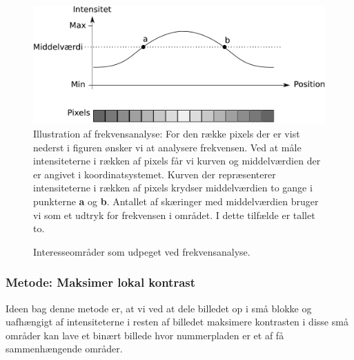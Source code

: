 \begin{figure}[htp]
  \centering
  \includegraphics[width=12cm]{system/illu/frekvensanalyse.pdf}  
  \caption{Illustration af frekvensanalyse: For den række pixels der er vist nederst i figuren ønsker vi at analysere frekvensen. Ved at måle intensiteterne i rækken af pixels får vi kurven og middelværdien der er angivet i koordinatsystemet. Kurven der repræsenterer intensiteterne i rækken af pixels krydser middelværdien to gange i punkterne \textbf{a} og \textbf{b}. Antallet af skæringer med middelværdien bruger vi som et udtryk for frekvensen i området. I dette tilfælde er tallet to.}
  \label{fig:DetectPlateness-frekvensanalyse}
\end{figure}

\begin{figure}[htp]
  \centering
  \caption{Interesseområder som udpeget ved frekvensanalyse.}
  \label{fig:DetectPlateness-binary}
\end{figure}

\subsubsection{Metode: Maksimer lokal kontrast}
Ideen bag denne metode er, at vi ved at dele billedet op i små blokke og uafhængigt af intensiteterne i resten af billedet maksimere kontrasten i disse små områder kan lave et binært billede hvor nummerpladen er et af få sammenhængende områder.

